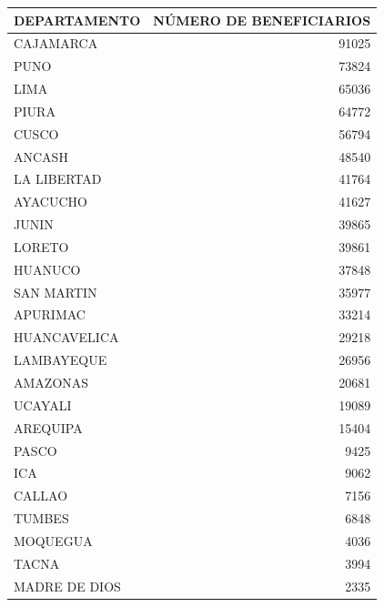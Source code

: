 \documentclass[12pt]{article}
\begin{document}
\begin{center}
	\scriptsize %
	\begin{tabular}{|l|r|}
		\hline
		\textbf{DEPARTAMENTO} & \textbf{NÚMERO DE BENEFICIARIOS} \\
		\hline
		CAJAMARCA        & 91025                   \\
		PUNO             & 73824                   \\
		LIMA             & 65036                   \\
		PIURA            & 64772                   \\
		CUSCO            & 56794                   \\
		ANCASH           & 48540                   \\
		LA LIBERTAD      & 41764                   \\
		AYACUCHO         & 41627                   \\
		JUNIN            & 39865                   \\
		LORETO           & 39861                   \\
		HUANUCO          & 37848                   \\
		SAN MARTIN       & 35977                   \\
		APURIMAC         & 33214                   \\
		HUANCAVELICA     & 29218                   \\
		LAMBAYEQUE       & 26956                   \\
		AMAZONAS         & 20681                   \\
		UCAYALI          & 19089                   \\
		AREQUIPA         & 15404                   \\
		PASCO            & 9425                    \\
		ICA              & 9062                    \\
		CALLAO           & 7156                    \\
		TUMBES           & 6848                    \\
		MOQUEGUA         & 4036                    \\
		TACNA            & 3994                    \\
		MADRE DE DIOS    & 2335                    \\
		\hline
	\end{tabular}
\end{center}
\end{document}
